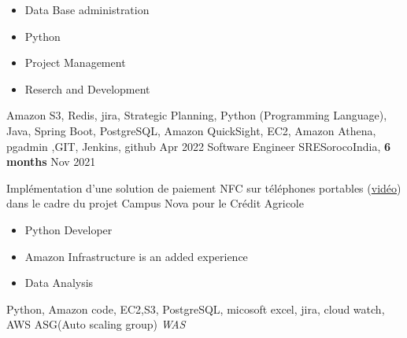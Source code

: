 \begin{experiences}
{\begin{itemize}
                        \item Data Base administration           
                        \item Python     
                        \item Project Management   
                        \item Reserch and Development   
                      \end{itemize}
                    }
                    {
                      Amazon S3, Redis, jira, Strategic Planning, Python (Programming Language), Java, Spring Boot, PostgreSQL, Amazon QuickSight, EC2, Amazon Athena, pgadmin
                      ,GIT, Jenkins, github
                    }
  \emptySeparator
  \experience
  {Apr 2022}  {Software Engineer SRE}{Soroco}{India, \textbf{6 months}}  
  {Nov 2021}   {
                      Implémentation d'une solution de paiement NFC sur téléphones portables (\href{http://www.nouvo.ch/s-007}{vidéo}) 
                      dans le cadre du projet Campus Nova pour le Crédit Agricole  
                      \begin{itemize}
                        \item Python Developer                                          
                        \item Amazon Infrastructure is an added experience  
                        \item Data Analysis  
                      \end{itemize}
                  }
                  {Python, Amazon code, EC2,S3, PostgreSQL, micosoft excel, jira, cloud watch, AWS ASG(Auto scaling group) \emph{WAS}}  
\end{experiences}

